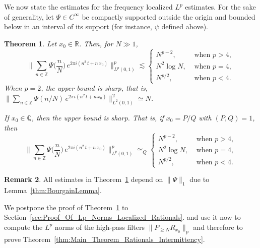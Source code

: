 \documentclass[11pt,reqno]{amsart}
\newtheorem{thm}{Theorem}[section]
\theoremstyle{definition}
\newtheorem{rem}[thm]{Remark}
\begin{document}
We now state the estimates for the frequency localized $L^p$ estimates. 
For the sake of generality, 
let $\Psi \in C^\infty$ be compactly supported outside the origin
and bounded below in an interval of its support (for instance, $\psi$ defined above).  
\begin{thm}\label{thm:Lp_Norms_Upper_And_Rationals}
Let $x_0 \in \mathbb R$.
Then, for $N \gg 1$, 
 \begin{equation}\label{eq:LpNorm_Upper}
\Big\lVert  \sum_{n \in \mathbb Z} \Psi \big(\frac{n}{N}\big)\,  e^{2\pi i (n^2 \, t + n \, x_0)}  \Big\rVert_{L^p(0,1)}^p
\lesssim 
  \left\{
 \begin{array}{ll}
 N^{p-2}, & \text{ when } p > 4, \\
 N^2 \log N, & \text{ when } p=4, \\
 N^{p/2}, & \text{ when } p < 4. 
 \end{array}
 \right.
 \end{equation}
 When $p=2$, the upper bound is sharp, that is, 
$
\big\lVert  \sum_{n \in \mathbb Z} \Psi (n/N)\,  e^{2\pi i (n^2 \, t + n \, x_0)}  \big\rVert_{L^2(0,1)}^2
\simeq N
$. 

If $x_0 \in \mathbb Q$, then the upper bound is sharp. 
That is, if $x_0 = P/Q$ with $(P,Q)=1$, then 
 \begin{equation}\label{eq:LpNorm_Rationals}
\Big\lVert  \sum_{n \in \mathbb Z} \Psi\big(\frac{n}{N}\big)\,  e^{2\pi i (n^2 \, t + n \, x_0)}  \Big\rVert_{L^p(0,1)}^p
\simeq_Q
  \left\{
 \begin{array}{ll}
 N^{p-2}, & \text{ when } p > 4, \\
 N^2 \log N, & \text{ when } p=4, \\
 N^{p/2}, & \text{ when } p < 4. 
 \end{array}
 \right.
 \end{equation}
\end{thm}
\begin{rem}
All estimates in Theorem~\ref{thm:Lp_Norms_Upper_And_Rationals} depend on $\lVert \Psi \rVert_1$ due to Lemma~\ref{thm:BourgainLemma}. 
\end{rem}
We postpone the proof of Theorem~\ref{thm:Lp_Norms_Upper_And_Rationals} to Section~\ref{sec:Proof_Of_Lp_Norms_Localized_Rationals}. 
and use it now to compute the $L^p$ norms of the high-pass filters 
$\lVert P_{\geq N} R_{x_0} \rVert_p$
and therefore to prove Theorem~\ref{thm:Main_Theorem_Rationals_Intermittency}. 
\end{document}
